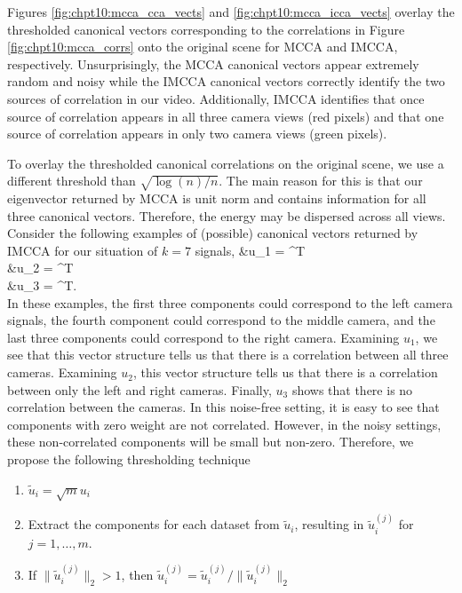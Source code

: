 Figures \ref{fig:chpt10:mcca_cca_vects} and \ref{fig:chpt10:mcca_icca_vects} overlay the thresholded
canonical vectors corresponding to the correlations in Figure \ref{fig:chpt10:mcca_corrs} onto the
original scene for MCCA and IMCCA, respectively. Unsurprisingly, the MCCA canonical
vectors appear extremely random and noisy while the IMCCA canonical vectors correctly
identify the two sources of correlation in our video. Additionally, IMCCA identifies
that once source of correlation appears in all three camera views (red pixels) and that
one source of correlation appears in only two camera views (green pixels). 

To overlay the thresholded canonical correlations on the original scene, we use a
different threshold than $\sqrt{\log(n)/n}$. The main reason for this is that our
eigenvector returned by MCCA is unit norm and contains information for all three canonical
vectors. Therefore, the energy may be dispersed across all views. Consider the following
examples of (possible) canonical vectors returned by IMCCA for our situation of $k=7$ signals,
\be\ba
&u_1 = ^T\\
&u_2 = ^T\\
&u_3 = \left[0, 0, 1, 0, 0, 0, 0, \right]^T.\\
\ea\ee
In these examples, the first three components could correspond to the left camera signals,
the fourth component could correspond to the middle camera, and the last three components
could correspond to the right camera. Examining $u_1$, we see that this vector structure
tells us that there is a correlation between all three cameras. Examining $u_2$, this
vector structure tells us that there is a correlation between only the left and right
cameras. Finally, $u_3$ shows that there is no correlation between the cameras. In this
noise-free setting, it is easy to see that components with zero weight are not
correlated. However, in the noisy settings, these non-correlated components will be small but
non-zero. Therefore, we propose the following thresholding technique 
\begin{enumerate}
\item $\widetilde{u}_i = \sqrt{m}u_i$
\item Extract the components for each dataset from $\widetilde{u}_i$, resulting in
  $\widetilde{u}_i^{(j)}$ for $j=1,\dots,m$. 
\item If $\|\widetilde{u}_i^{(j)}\|_2 >1$, then $\widetilde{u}_i^{(j)} = \widetilde{u}_i^{(j)}/\|\widetilde{u}_i^{(j)}\|_2$
\end{enumerate}
